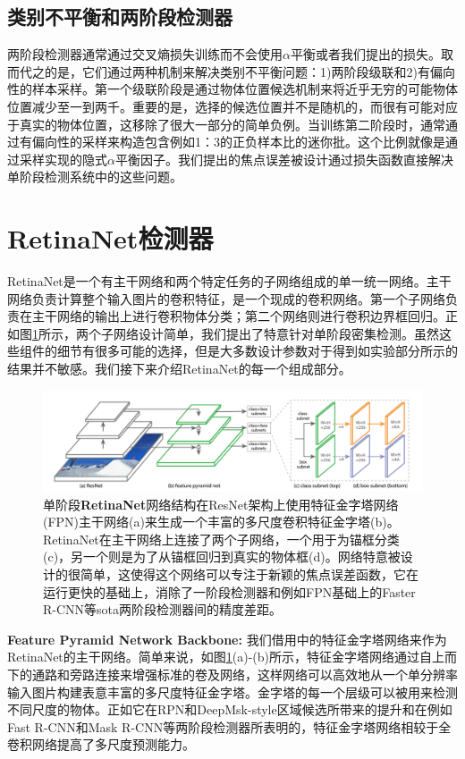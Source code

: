 \documentclass{ctexart}
\begin{document}
\subsection{类别不平衡和两阶段检测器}
两阶段检测器通常通过交叉熵损失训练而不会使用$\alpha$平衡或者我们提出的损失。取而代之的是，它们通过两种机制来解决类别不平衡问题：1)两阶段级联和2)有偏向性的样本采样。第一个级联阶段是通过物体位置候选机制来将近乎无穷的可能物体位置减少至一到两千。重要的是，选择的候选位置并不是随机的，而很有可能对应于真实的物体位置，这移除了很大一部分的简单负例。当训练第二阶段时，通常通过有偏向性的采样来构造包含例如1：3的正负样本比的迷你批。这个比例就像是通过采样实现的隐式$\alpha$平衡因子。我们提出的焦点误差被设计通过损失函数直接解决单阶段检测系统中的这些问题。
\section{RetinaNet检测器}
RetinaNet是一个有主干网络和两个特定任务的子网络组成的单一统一网络。主干网络负责计算整个输入图片的卷积特征，是一个现成的卷积网络。第一个子网络负责在主干网络的输出上进行卷积物体分类；第二个网络则进行卷积边界框回归。正如图\ref{fig:network}所示，两个子网络设计简单，我们提出了特意针对单阶段密集检测。虽然这些组件的细节有很多可能的选择，但是大多数设计参数对于得到如实验部分所示的结果并不敏感。我们接下来介绍RetinaNet的每一个组成部分。\par
\begin{figure}[h] \label{fig:network}
    \centering
    \includegraphics[width=.8\textwidth]{images/network.png}
    \caption{单阶段\textbf{RetinaNet}网络结构在ResNet架构上使用特征金字塔网络(FPN)\cite{fpn}主干网络(a)来生成一个丰富的多尺度卷积特征金字塔(b)。RetinaNet在主干网络上连接了两个子网络，一个用于为锚框分类(c)，另一个则是为了从锚框回归到真实的物体框(d)。网络特意被设计的很简单，这使得这个网络可以专注于新颖的焦点误差函数，它在运行更快的基础上，消除了一阶段检测器和例如FPN基础上的Faster R-CNN等sota两阶段检测器间的精度差距。}
\end{figure}
\textbf{Feature Pyramid Network Backbone:} 我们借用\cite{fpn}中的特征金字塔网络来作为RetinaNet的主干网络。简单来说，如图\ref{fig:network}(a)-(b)所示，特征金字塔网络通过自上而下的通路和旁路连接来增强标准的卷及网络，这样网络可以高效地从一个单分辨率输入图片构建表意丰富的多尺度特征金字塔。金字塔的每一个层级可以被用来检测不同尺度的物体。正如它在RPN和DeepMsk-style区域候选所带来的提升和在例如Fast R-CNN和Mask R-CNN\cite{mask_r_cnn}等两阶段检测器所表明的，特征金字塔网络相较于全卷积网络提高了多尺度预测能力。\par
\end{document}
